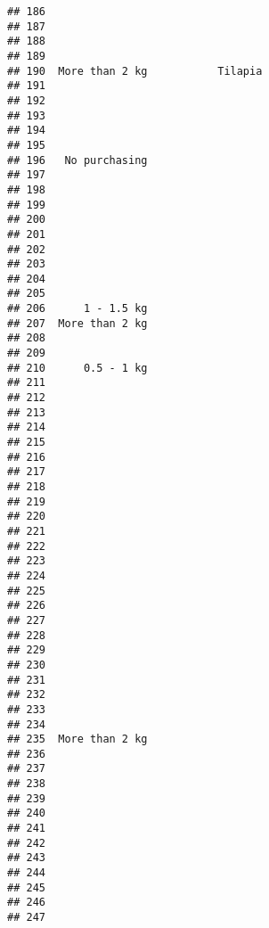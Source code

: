 \documentclass[
]{article}
\begin{document}
\begin{verbatim}
## 186                                   
## 187                                   
## 188                                   
## 189                                   
## 190  More than 2 kg           Tilapia 
## 191                                   
## 192                                   
## 193                                   
## 194                                   
## 195                                   
## 196   No purchasing                   
## 197                                   
## 198                                   
## 199                                   
## 200                                   
## 201                                   
## 202                                   
## 203                                   
## 204                                   
## 205                                   
## 206      1 - 1.5 kg                   
## 207  More than 2 kg                   
## 208                                   
## 209                                   
## 210      0.5 - 1 kg                   
## 211                                   
## 212                                   
## 213                                   
## 214                                   
## 215                                   
## 216                                   
## 217                                   
## 218                                   
## 219                                   
## 220                                   
## 221                                   
## 222                                   
## 223                                   
## 224                                   
## 225                                   
## 226                                   
## 227                                   
## 228                                   
## 229                                   
## 230                                   
## 231                                   
## 232                                   
## 233                                   
## 234                                   
## 235  More than 2 kg                   
## 236                                   
## 237                                   
## 238                                   
## 239                                   
## 240                                   
## 241                                   
## 242                                   
## 243                                   
## 244                                   
## 245                                   
## 246                                   
## 247                                   

\end{verbatim}
\end{document}
